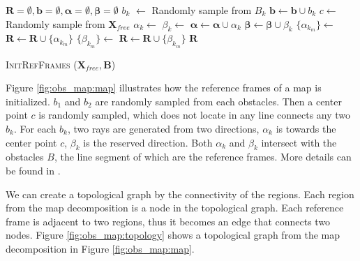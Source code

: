 \documentclass[letterpaper, 10 pt, conference]{ieeeconf}
\begin{document}
\begin{algorithm}[hbtp]
	\begin{algorithmic}[1]
		\State $ \bm{R} = \emptyset, \bm{b} = \emptyset, \bm{\alpha} = \emptyset, \bm{\beta} = \emptyset $
		\State $ b_{k} $ $ \leftarrow $ Randomly sample from $ B_{k} $
		\State $ \bm{b} \leftarrow \bm{b} \cup b_{k} $
		\EndFor
		\State $ c \leftarrow  $ Randomly sample from $ \bm{X}_{free} $
		\EndWhile
		\State $ \alpha_{k} \leftarrow $ 
		\State $ \beta_{k} \leftarrow $ 
		\State $ \bm{\alpha} \leftarrow \bm{\alpha} \cup \alpha_{k} $
		\State $ \bm{\beta} \leftarrow \bm{\beta} \cup \beta_{k} $			
		\EndFor
		\State $ \{ \alpha_{k_{m}} \} \leftarrow $ 
		\State $ \bm{R} \leftarrow \bm{R} \cup \{ \alpha_{k_{m}} \} $
		\EndFor
		\State $ \{ \beta_{k_{m}} \} \leftarrow $ 
		\State $ \bm{R} \leftarrow \bm{R} \cup \{ \beta_{k_{m}} \} $
		\EndFor
		\Return $ \bm{R} $
	\end{algorithmic}
	\caption{ \textsc{InitRefFrames} ($ \bm{X}_{free} , \bm{B} $) }
	\label{alg:harrt:init_ref_frames}
\end{algorithm} 

Figure \ref{fig:obs_map:map} illustrates how the reference frames of a map is initialized.
$ b_{1} $ and $ b_{2} $ are randomly sampled from each obstacles.
Then a center point $ c $ is randomly sampled, which does not locate in any line connects any two $ b_{k} $.
For each $ b_{k} $, two rays are generated from two directions, $ \alpha_{k} $ is towards the center point $ c $, $ \beta_{k} $ is the reserved direction.
Both $ \alpha_{k} $ and $ \beta_{k} $ intersect with the obstacles $ B $, the line segment of which are the reference frames.
More details can be found in \cite{Hernandez201544}.

We can create a topological graph by the connectivity of the regions.
Each region from the map decomposition is a node in the topological graph.
Each reference frame is adjacent to two regions, thus it becomes an edge that connects two nodes.
Figure \ref{fig:obs_map:topology} shows a topological graph from the map decomposition in Figure \ref{fig:obs_map:map}.
\end{document}
